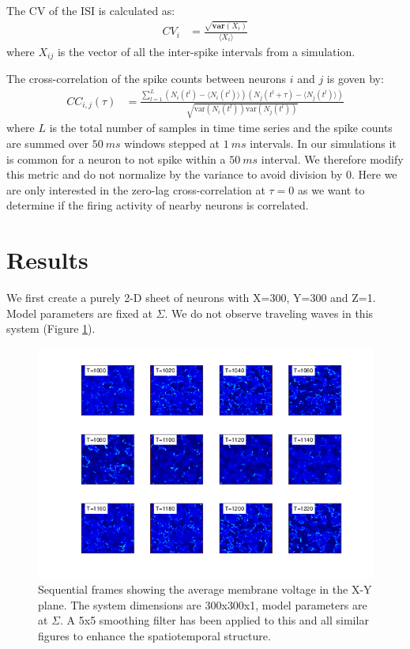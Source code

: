 \documentclass[12pt]{article}
\begin{document}
The CV of the ISI is calculated as:
\begin{align}\label{eq:cv}
 CV_{i} &= \frac{\sqrt{\textbf{var}(X_{i})}}{\langle X_{i} \rangle}
\end{align}
where $X_{ij}$ is the vector of all the inter-spike intervals from a simulation.

The cross-correlation of the spike counts between neurons $i$ and $j$ is goven by:
\begin{align}\label{eq:cross_correlation}
 CC_{i,j}(\tau) &= \frac{ \sum_{l=1}^L (N_i(t^l)-\langle N_i(t^l) \rangle) (N_j(t^l+\tau)-\langle N_j(t^l) \rangle) } { \sqrt{\text{var}(N_i(t^l))\text{var}(N_j(t^l))}  }
\end{align}
where $L$ is the total number of samples in time time series and the spike counts are summed over $50~ms$ windows stepped at $1~ms$ intervals.
In our simulations it is common for a neuron to not spike within a $50~ms$ interval.
We therefore modify this metric and do not normalize by the variance to avoid division by $0$.
Here we are only interested in the zero-lag cross-correlation at $\tau=0$ as we want to determine if the firing activity of nearby neurons is correlated.


\section{Results}
We first create a purely 2-D sheet of neurons with X=300, Y=300 and Z=1.
Model parameters are fixed at $\Sigma$.
We do not observe traveling waves in this system (Figure \ref{fig:Pure2DRasters_NoWaves}).
\begin{figure}[!htb]
 \caption{Sequential frames showing the average membrane voltage in the X-Y plane.
          The system dimensions are 300x300x1, model parameters are at $\Sigma$. 
	  A 5x5 smoothing filter has been applied to this and all similar figures to enhance the spatiotemporal structure.}
 \label{fig:Pure2DRasters_NoWaves}
 \centering
   \includegraphics[width=\textwidth]{fig/2D_1LayerNoWaves}
\end{figure}
\FloatBarrier
\end{document}
